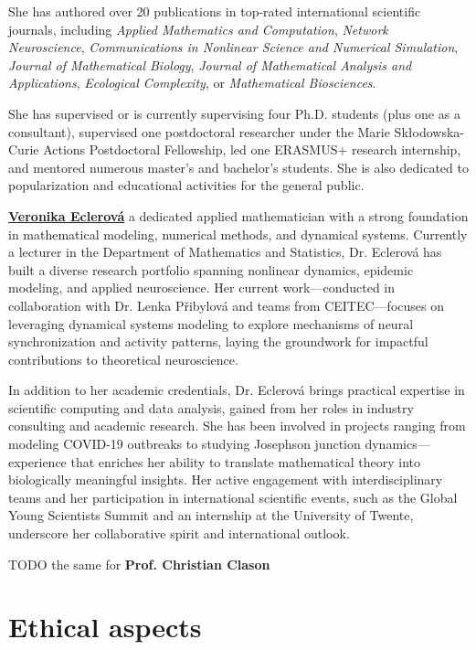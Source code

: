 \documentclass[a4paper,11pt]{scrartcl}
\begin{document}
She has authored over 20 publications in top-rated international scientific journals, including \textit{Applied Mathematics and Computation}, \textit{Network Neuroscience}, \textit{Communications in Nonlinear Science and Numerical Simulation}, \textit{Journal of Mathematical Biology}, \textit{Journal of Mathematical Analysis and Applications}, \textit{Ecological Complexity}, or \textit{Mathematical Biosciences}.

She has supervised or is currently supervising four Ph.D. students (plus one as a consultant), supervised one postdoctoral researcher under the Marie Skłodowska-Curie Actions Postdoctoral Fellowship, led one ERASMUS+ research internship, and mentored numerous master's and bachelor's students. She is also dedicated to popularization and educational activities for the general public.

\href{https://orcid.org/0000-0001-8476-7740}{\textbf{Veronika Eclerová}} a dedicated applied mathematician with a strong foundation in mathematical modeling, numerical methods, and dynamical systems. Currently a lecturer in the Department of Mathematics and Statistics, Dr. Eclerová has built a diverse research portfolio spanning nonlinear dynamics, epidemic modeling, and applied neuroscience. Her current work—conducted in collaboration with Dr. Lenka Přibylová and teams from CEITEC—focuses on leveraging dynamical systems modeling to explore mechanisms of neural synchronization and activity patterns, laying the groundwork for impactful contributions to theoretical neuroscience.

In addition to her academic credentials, Dr. Eclerová brings practical expertise in scientific computing and data analysis, gained from her roles in industry consulting and academic research. She has been involved in projects ranging from modeling COVID-19 outbreaks to studying Josephson junction dynamics—experience that enriches her ability to translate mathematical theory into biologically meaningful insights. Her active engagement with interdisciplinary teams and her participation in international scientific events, such as the Global Young Scientists Summit and an internship at the University of Twente, underscore her collaborative spirit and international outlook. 

TODO the same for \textbf{Prof. Christian Clason}

\section{Ethical aspects}\label{sec:ethics}
\end{document}
